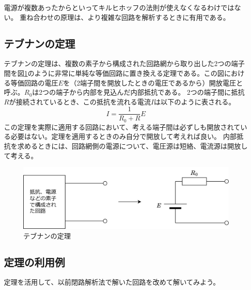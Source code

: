 \documentclass{ltjsreport}
\begin{document}
電源が複数あったからといってキルヒホッフの法則が使えなくなるわけではない。
重ね合わせの原理は、より複雑な回路を解析するときに有用である。



\subsection{テブナンの定理}\label{sec:Thevenin}
テブナンの定理は、複数の素子から構成された回路網から取り出した2つの端子間を図\ref{fig:Thevenin}のように非常に単純な等価回路に置き換える定理である。この図における等価回路の電圧$E$を（2端子間を開放したときの電圧であるから）開放電圧と呼ぶ。$R_0$は2つの端子から内部を見込んだ内部抵抗である。
2つの端子間に抵抗$R$が接続されているとき、この抵抗を流れる電流$I$は以下のように表される。
\[
  I = \frac{1}{R_0+R}E
\]
この定理を実際に適用する回路において、考える端子間は必ずしも開放されている必要はない。定理を適用するときのみ自分で開放して考えれば良い。
内部抵抗を求めるときには、回路網側の電源について、電圧源は短絡、電流源は開放して考える。

\begin{figure}[tbh]
  \centering
  \includegraphics[keepaspectratio, scale=0.07]
       {img/Thevenin.drawio.png}
  \caption{テブナンの定理}
  \label{fig:Thevenin}
 \end{figure}



\subsection{定理の利用例}

定理を活用して、以前閉路解析法で解いた回路を改めて解いてみよう。
\end{document}
